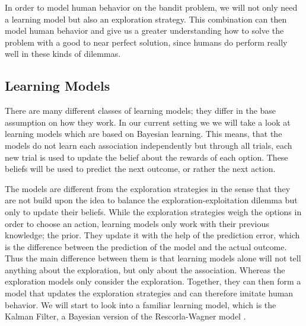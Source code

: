 In order to model human behavior on the bandit problem, we will not only need a learning model but also an exploration strategy. This combination can then model human behavior and give us a greater understanding how to solve the problem with a good to near perfect solution, since humans do perform really well in these kinds of dilemmas. 

\subsection{Learning Models}
There are many different classes of learning models; they differ in the base assumption on how they work. In our current setting we we will take a look at learning models which are based on Bayesian learning. 
This means, that the models do not learn each association independently but through all trials, each new trial is used to update the belief about the rewards of each option. These beliefs will be used to predict the next outcome, or rather the next action. 

The models are different from the exploration strategies in the sense that they are not build upon the idea to balance the exploration-exploitation dilemma but only to update their beliefs. While the exploration strategies weigh the options in order to choose an action, learning models only work with their previous knowledge; the prior. They update it with the help of the prediction error, which is the difference between the prediction of the model and the actual outcome. Thus the main difference between them is that learning models alone will not tell anything about the exploration, but only about the association. Whereas the exploration models only consider the exploration. Together, they can then form a model that updates the exploration strategies and can therefore imitate human behavior.
We will start to look into a familiar learning model, which is the Kalman Filter, a Bayesian version of the Rescorla-Wagner model \citep{gershman2015unifying}.


